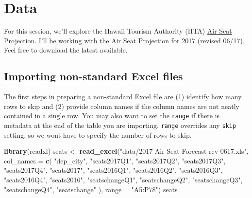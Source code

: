 \documentclass[]{book}
\newenvironment{Shaded}{\begin{snugshade}}{\end{snugshade}}
\newcommand{\KeywordTok}[1]{\textcolor[rgb]{0.13,0.29,0.53}{\textbf{{#1}}}}
\newcommand{\DataTypeTok}[1]{\textcolor[rgb]{0.13,0.29,0.53}{{#1}}}
\newcommand{\StringTok}[1]{\textcolor[rgb]{0.31,0.60,0.02}{{#1}}}
\newcommand{\NormalTok}[1]{{#1}}
\theoremstyle{definition}
\theoremstyle{definition}
\theoremstyle{remark}
\begin{document}
\section{Data}\label{data}

For this session, we'll explore the Hawaii Tourism Authority (HTA)
\href{http://www.hawaiitourismauthority.org/research/research/infrastructure-research/}{Air
Seat Projection}. I'll be working with the
\href{http://www.hawaiitourismauthority.org/default/assets/File/2017\%20Air\%20Seat\%20Forecast\%20rev\%200617.xls}{Air
Seat Projection for 2017 (revised 06/17)}. Feel free to download the
latest available.

\subsection{Importing non-standard Excel
files}\label{importing-non-standard-excel-files}

The first steps in preparing a non-standard Excel file are (1) identify
how many rows to skip and (2) provide column names if the column names
are not neatly contained in a single row. You may also want to set the
\texttt{range} if there is metadata at the end of the table you are
importing. \texttt{range} overrides any \texttt{skip} setting, so we
wont have to specify the number of rows to skip.

\begin{Shaded}
\begin{Highlighting}[]
\KeywordTok{library}\NormalTok{(readxl)}
\NormalTok{seats <-}\StringTok{ }\KeywordTok{read_excel}\NormalTok{(}\StringTok{"data/2017 Air Seat Forecast rev 0617.xls"}\NormalTok{, }\DataTypeTok{col_names =} \KeywordTok{c}\NormalTok{(}
  \StringTok{"dep_city"}\NormalTok{, }
  \StringTok{"seats2017Q1"}\NormalTok{, }\StringTok{"seats2017Q2"}\NormalTok{, }\StringTok{"seats2017Q3"}\NormalTok{, }\StringTok{"seats2017Q4"}\NormalTok{, }\StringTok{"seats2017"}\NormalTok{, }
  \StringTok{"seats2016Q1"}\NormalTok{, }\StringTok{"seats2016Q2"}\NormalTok{, }\StringTok{"seats2016Q3"}\NormalTok{, }\StringTok{"seats2016Q4"}\NormalTok{, }\StringTok{"seats2016"}\NormalTok{,}
  \StringTok{"seatschangeQ1"}\NormalTok{, }\StringTok{"seatschangeQ2"}\NormalTok{, }\StringTok{"seatschangeQ3"}\NormalTok{, }\StringTok{"seatschangeQ4"}\NormalTok{, }\StringTok{"seatschange"}
\NormalTok{), }\DataTypeTok{range =} \StringTok{"A5:P78"}\NormalTok{)}
\NormalTok{seats}
\end{Highlighting}
\end{Shaded}
\end{document}
